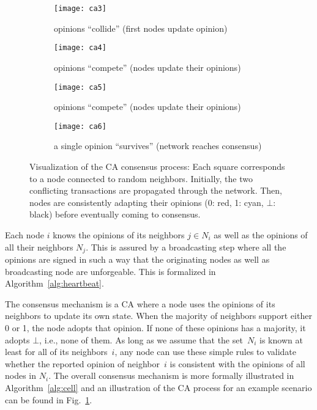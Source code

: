 \documentclass[../main.tex]{subfiles}
\begin{document}
\begin{figure}[h]
	\captionsetup[sub]{font=footnotesize}
	\centering
	\hfill
	\begin{subfigure}[b]{0.49\linewidth}
		\texttt{[image: ca3]}
		\caption{opinions ``collide'' (first nodes update opinion)}
	\end{subfigure}
	\begin{subfigure}[b]{0.49\linewidth}
		\texttt{[image: ca4]}
		\caption{opinions ``compete'' (nodes update their opinions)}
	\end{subfigure}
	\hfill
	\begin{subfigure}[b]{0.49\linewidth}
		\texttt{[image: ca5]}
		\caption{opinions ``compete'' (nodes update their opinions)}
	\end{subfigure}
	\hfill
	\begin{subfigure}[b]{0.49\linewidth}
		\texttt{[image: ca6]}
		\caption{a single opinion ``survives'' (network reaches consensus)}
	\end{subfigure}
	\caption{Visualization of the CA consensus process:
		Each square corresponds to a node connected to random neighbors.
		Initially, the two conflicting transactions are propagated through the network.
		Then, nodes are consistently adapting their opinions (0: red, 1: cyan, $\bot$: black) before eventually coming to consensus.}
	\label{fig:ca}
\end{figure}

Each node $i$ knows the opinions of its neighbors $j \in N_i$ as well as the opinions of all their neighbors $N_j$.
This is assured by a broadcasting step where all the opinions are signed in such a way that the originating nodes as well as broadcasting node are unforgeable.
This is formalized in Algorithm~\ref{alg:heartbeat}.

The consensus mechanism is a CA where a node uses the opinions of its neighbors to update its own state.
When the majority of neighbors support either 0 or 1, the node adopts that opinion.
If none of these opinions has a majority, it adopts $\bot$, i.e., none of them.
As long as we assume that the set~$N_i$ is known at least for all of its neighbors~$i$, any node can use these simple rules to validate whether the reported opinion of neighbor~$i$ is consistent with the opinions of all nodes in $N_i$.
The overall consensus mechanism is more formally illustrated in Algorithm~\ref{alg:cell} and an illustration of the CA process for an example scenario can be found in Fig.~\ref{fig:ca}.
\end{document}
